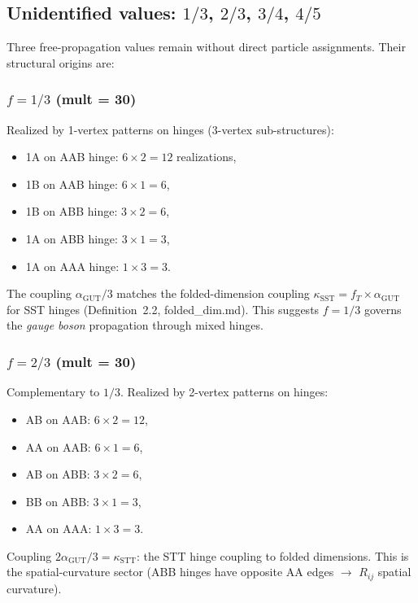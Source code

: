 \documentclass[12pt]{article}
\theoremstyle{remark}
\theoremstyle{definition}
\newcommand{\agut}{\alpha_{\mathrm{GUT}}}
\begin{document}
\subsection{Unidentified values: $1/3$, $2/3$, $3/4$, $4/5$}
\label{sec:unidentified}

Three free-propagation values remain without direct particle assignments.  Their structural origins are:

\subsubsection{$f = 1/3$ (mult = 30)}

Realized by 1-vertex patterns on hinges (3-vertex sub-structures):
\begin{itemize}
\item 1A on AAB hinge: $6 \times 2 = 12$ realizations,
\item 1B on AAB hinge: $6 \times 1 = 6$,
\item 1B on ABB hinge: $3 \times 2 = 6$,
\item 1A on ABB hinge: $3 \times 1 = 3$,
\item 1A on AAA hinge: $1 \times 3 = 3$.
\end{itemize}
The coupling $\agut/3$ matches the folded-dimension coupling $\kappa_\mathrm{SST} = f_T \times \agut$ for SST hinges (Definition~2.2, folded\_dim.md).  This suggests $f = 1/3$ governs the \emph{gauge boson} propagation through mixed hinges.

\subsubsection{$f = 2/3$ (mult = 30)}

Complementary to $1/3$.  Realized by 2-vertex patterns on hinges:
\begin{itemize}
\item AB on AAB: $6 \times 2 = 12$,
\item AA on AAB: $6 \times 1 = 6$,
\item AB on ABB: $3 \times 2 = 6$,
\item BB on ABB: $3 \times 1 = 3$,
\item AA on AAA: $1 \times 3 = 3$.
\end{itemize}
Coupling $2\agut/3 = \kappa_\mathrm{STT}$: the STT hinge coupling to folded dimensions.  This is the spatial-curvature sector (ABB hinges have opposite AA edges $\to$ $R_{ij}$ spatial curvature).
\end{document}
